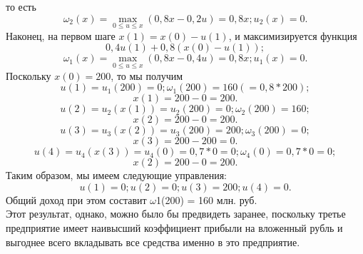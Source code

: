 то есть
 \begin{equation*}
\omega_2(x) = \max_{0 \le u \le x}(0,8x-0,2u)=0,8x;u_2(x)=0.
\end{equation*}
\indent Наконец, на первом шаге  $x(1)=x(0)-u(1)$, и максимизируется функция
 \begin{equation*}
0,4u(1)+0,8(x(0)-u(1));
\end{equation*}
\begin{equation*}
\omega_1(x) = \max_{0 \le u \le x}(0,8x-0,4u)=0,8x;u_1(x)=0.
\end{equation*}
\indent Поскольку $x(0)=200$, то мы получим
 \begin{equation*}
u(1)=u_1(200)=0;\omega_1(200)=160(=0,8*200);
\end{equation*}
 \begin{equation*}
x(1)=200-0=200.
\end{equation*}
 \begin{equation*}
u(2)=u_2(x(1))=u_2(200)=0;\omega_2(200)=160;
\end{equation*}
 \begin{equation*}
x(2)=200-0=200.
\end{equation*}
 \begin{equation*}
u(3)=u_3(x(2))=u_3(200)=200;\omega_3(200)=0;
\end{equation*}
 \begin{equation*}
x(3)=200-200=0.
\end{equation*}
\begin{equation*}
u(4)=u_4(x(3))=u_4(0)=0,7*0=0;\omega_4(0)=0,7*0=0;
\end{equation*}
 \begin{equation*}
x(2)=200-0=200.
\end{equation*}
\indent Таким образом, мы имеем следующие управления:
 \begin{equation*}
u(1)=0; u(2) = 0; u(3)=200; u(4)=0.
\end{equation*}
\indent Общий доход при этом составит $\omega$1(200) = 160 млн. руб.\\
\indent Этот результат, однако, можно было бы предвидеть заранее, поскольку третье предприятие имеет наивысший коэффициент прибыли на вложенный рубль и выгоднее всего вкладывать все средства именно в это предприятие.
